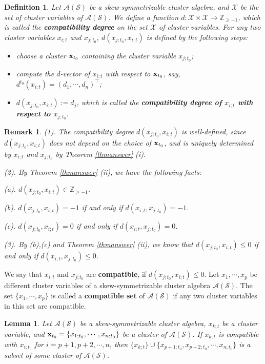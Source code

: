 \documentclass[14pt]{amsart}
\newtheorem{Lemma}[Theorem]{Lemma}
\newtheorem{Definition}[Theorem]{Definition}
\newtheorem{Remark}[Theorem]{Remark}
\begin{document}
\begin{Definition}\label{defdegree}
Let $\mathcal A(\mathcal S)$ be a skew-symmetrizable cluster algebra, and $\mathcal X$ be the set of cluster variables of  $\mathcal A(\mathcal S)$. We define a function $d:\mathcal X\times\mathcal X\rightarrow\mathbb Z_{\geq -1}$, which is called the {\bf compatibility degree} on the set $\mathcal X$ of cluster variables. For any two cluster variables $x_{i;t}$ and $x_{j;t_0}$, $d(x_{j;t_0},x_{i;t})$ is defined by the following steps:
\begin{itemize}
\item choose a cluster ${\bf x}_{t_0}$ containing the cluster variable $x_{j;t_0}$;
\item compute the $d$-vector of $x_{i;t}$ with respect to ${\bf x}_{t_0}$, say, $d^{t_0}(x_{i;t})=(d_1,\cdots,d_n)^{\top}$;
    \item $d(x_{j;t_0},x_{i;t}):=d_j$, which is called the {\bf compatibility degree of $x_{i;t}$ with respect to $x_{j;t_0}$}.
\end{itemize}
\end{Definition}
\begin{Remark}
(1). The compatibility degree $d(x_{j;t_0},x_{i;t})$ is well-defined, since $d(x_{j;t_0},x_{i;t})$ does not depend on the choice of ${\bf x}_{t_0}$, and is uniquely determined by $x_{i;t}$ and $x_{j;t_0}$ by Theorem \ref{thmanswer} (i).

(2). By  Theorem \ref{thmanswer} (ii), we have the following facts:

(a).  $d(x_{j;t_0},x_{i;t})\in \mathbb{Z}_{\geq -1}$.

(b). $d(x_{j;t_0},x_{i;t})=-1$ if and only if $d(x_{i;t},x_{j;t_0})=-1$.

(c).  $d(x_{j;t_0},x_{i;t})=0$ if and only if $d(x_{i;t},x_{j;t_0})=0$.

(3). By (b),(c) and Theorem \ref{thmanswer} (ii), we know that $d(x_{j;t_0},x_{i;t})\leq0$ if and only if $d(x_{i;t},x_{j;t_0})\leq0$.
\end{Remark}


 We say that $x_{i;t}$ and $x_{j;t_0}$ are {\bf compatible}, if $d(x_{j;t_0},x_{i;t})\leq0$.
Let  $x_1,\cdots,x_p$ be different cluster variables of a skew-symmetrizable cluster algebra $\mathcal A(\mathcal S)$.  The set  $\{x_1,\cdots,x_p\}$ is called a {\bf compatible set} of $\mathcal A(\mathcal S)$ if any two cluster variables in this set are compatible.


 \begin{Lemma}\label{lemcompatible}
 Let $\mathcal A(\mathcal S)$ be a skew-symmetrizable cluster algebra, $x_{k;t}$ be a cluster variable, and ${\bf x}_{t_0}=\{x_{1;t_0},\cdots,x_{n;t_0}\}$ be a cluster of  $\mathcal A(\mathcal S)$. If $x_{k;t}$ is compatible with $x_{i;t_0}$ for $i=p+1,p+2,\cdots,n$, then $\{x_{k;t}\}\cup \{x_{p+1;t_0},x_{p+2;t_0},\cdots,x_{n;t_0}\}$ is a subset of some cluster of $\mathcal A(\mathcal S)$.
 \end{Lemma}
\end{document}
